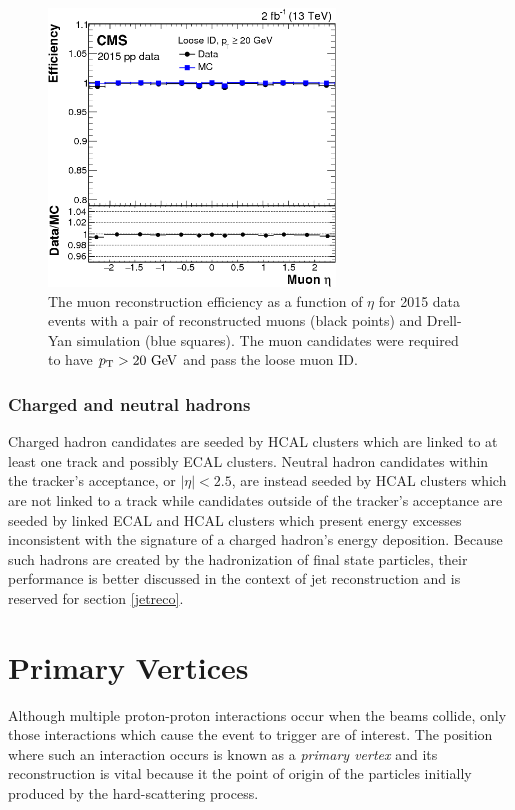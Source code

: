 \begin{figure}[htbp]
  \centering
    \includegraphics[width=3in]{images/muonrecoeff}
    \caption[Muon Reconstruction Efficiency]{The muon reconstruction efficiency as a function of $\eta$ for 2015 data events with a pair of reconstructed muons (black points) and Drell-Yan simulation (blue squares). The muon candidates were required to have $p_{\mathrm{T}} > 20\ \mathrm{GeV}$ and pass the loose muon ID.\cite{CMSMUONPERF}}
    \label{fig:muonrecoperf}
\end{figure}

\subsubsection{Charged and neutral hadrons}

Charged hadron candidates are seeded by HCAL clusters which are linked to at least one track and possibly ECAL clusters. Neutral hadron candidates within the tracker's acceptance, or $\left| \eta \right| < 2.5$, are instead seeded by HCAL clusters which are not linked to a track while candidates outside of the tracker's acceptance are seeded by linked ECAL and HCAL clusters which present energy excesses inconsistent with the signature of a charged hadron's energy deposition. Because such hadrons are created by the hadronization of final state particles, their performance is better discussed in the context of jet reconstruction and is reserved for section \ref{jetreco}.

\section{Primary Vertices}

Although multiple proton-proton interactions occur when the beams collide, only those interactions which cause the event to trigger are of interest. The position where such an interaction occurs is known as a \textit{primary vertex} and its reconstruction is vital because it the point of origin of the particles initially produced by the hard-scattering process.

